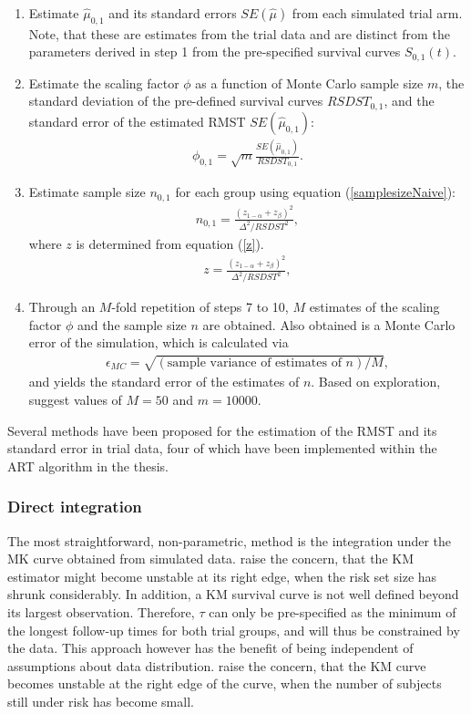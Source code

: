 \documentclass[main.tex]{subfiles}
\begin{document}
\begin{enumerate}
    \item Estimate $\hat{\mu}_{0,1}$ and its standard errors $SE(\hat{\mu})$ from each simulated trial arm. Note, that these are estimates from the trial data and are distinct from the parameters derived in step 1 from the pre-specified survival curves $S_{0,1}(t)$.
    \item Estimate the scaling factor $\phi$ as a function of Monte Carlo sample size $m$, the standard deviation of the pre-defined survival curves $RSDST_{0,1}$, and the standard error of the estimated RMST $SE(\hat{\mu}_{0,1})$:
\begin{align}
\phi_{0, 1}=\sqrt{m}\frac{SE(\hat{\mu}_{0,1})}{RSDST_{0,1}}.
\end{align}
    \item Estimate sample size $n_{0,1}$ for each group using equation (\ref{samplesizeNaive}):
\begin{align}
n_{0,1}=\frac{(z_{1-\alpha}+z_\beta)^2}{\Delta^2 / RSDST^2},
\end{align}
    where $z$ is determined from equation (\ref{z}).
\begin{align}
z=\frac{(z_{1-\alpha}+z_\beta)^2}{\Delta^2 / RSDST^2},
\end{align}
    \item Through an $M$-fold repetition of steps 7 to 10, $M$ estimates of the scaling factor $\phi$ and the sample size $n$ are obtained. Also obtained is a Monte Carlo error of the simulation, which is calculated via
 \begin{align}
\epsilon_{MC} = \sqrt{(\text{sample variance of estimates of }n)/M},
\end{align}
and yields the standard error of the estimates of $n$. Based on exploration, \textcite{royston2013restricted} suggest values of $M = 50$ and $m = 10000$.
\end{enumerate}
Several methods have been proposed for the estimation of the RMST and its standard error in trial data, four of which have been implemented within the ART algorithm in the thesis.
\subsubsection{Direct integration}
The most straightforward, non-parametric, method is the integration under the MK curve obtained from simulated data. \textcite{royston2011flexible} raise the concern, that the KM estimator might become unstable at its right edge, when the risk set size has shrunk considerably. In addition, a KM survival curve is not well defined beyond its largest observation. Therefore, $\tau$ can only be pre-specified as the minimum of the longest follow-up times for both trial groups, and will thus be constrained by the data. This approach however has the benefit of being independent of assumptions about data distribution. \textcite{Royston2011-bd} raise the concern, that the KM curve becomes unstable at the right edge of the curve, when the number of subjects still under risk has become small.
\end{document}
